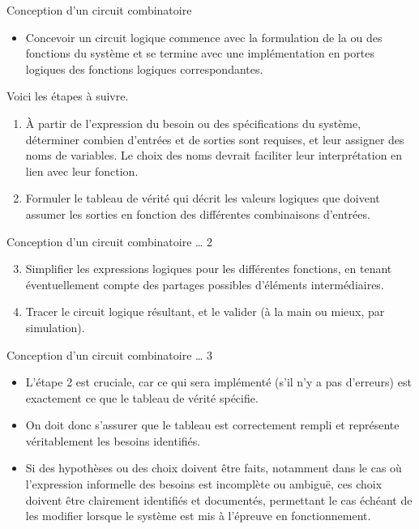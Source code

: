 \documentclass[presentation]{beamer}
\begin{document}
\begin{frame}[label={sec:org87d3225}]{Conception d'un circuit combinatoire}
\begin{itemize}
\item Concevoir un circuit logique commence avec la formulation de la ou des fonctions du système et se termine avec une implémentation en portes logiques des fonctions logiques correspondantes.
\end{itemize}

Voici les étapes à suivre.

\begin{enumerate}
\item À partir de l'expression du besoin ou des spécifications du
système, déterminer combien d'entrées et de sorties sont
requises, et leur assigner des noms de variables. Le choix des noms
devrait faciliter leur interprétation en lien avec leur fonction.

\item Formuler le tableau de vérité qui décrit les valeurs logiques que
doivent assumer les sorties en fonction des différentes
combinaisons d'entrées.
\end{enumerate}
\end{frame}

\begin{frame}[label={sec:org758ecc4}]{Conception d'un circuit combinatoire \ldots{} 2}
\begin{enumerate}
\setcounter{enumi}{2}
\item Simplifier les expressions logiques pour les différentes fonctions,
en tenant éventuellement compte des partages possibles d'éléments
intermédiaires.

\item Tracer le circuit logique résultant, et le valider (à la main ou
mieux, par simulation).
\end{enumerate}
\end{frame}

\begin{frame}[label={sec:org716820c}]{Conception d'un circuit combinatoire \ldots{} 3}
\begin{itemize}
\item L'étape 2 est cruciale, car ce qui sera implémenté (s'il n'y a pas d'erreurs) est exactement ce que le tableau de vérité spécifie.

\item On doit donc s'assurer que le tableau est correctement rempli et représente véritablement les besoins identifiés.

\item Si des hypothèses ou des choix doivent être faits, notamment dans le cas où l'expression informelle des besoins est incomplète ou ambiguë, ces choix doivent être clairement identifiés et documentés, permettant le cas échéant de les modifier lorsque le système est mis à l'épreuve en fonctionnement.
\end{itemize}
\end{frame}
\end{document}
